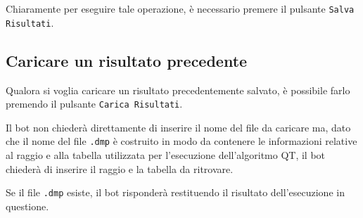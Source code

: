 
Chiaramente per eseguire tale operazione, è necessario premere il pulsante \texttt{Salva Risultati}. 


\subsection{Caricare un risultato precedente}

Qualora si voglia caricare un risultato precedentemente salvato, è possibile farlo premendo il pulsante \texttt{Carica Risultati}. 


Il bot non chiederà direttamente di inserire il nome del file da caricare ma, dato che il nome del file \texttt{.dmp} è costruito in modo da contenere le informazioni relative al raggio e alla tabella utilizzata per l'esecuzione dell'algoritmo QT, il bot chiederà di inserire il raggio e  la tabella da ritrovare. 

Se il file \texttt{.dmp} esiste, il bot risponderà restituendo il risultato dell'esecuzione in questione. 

